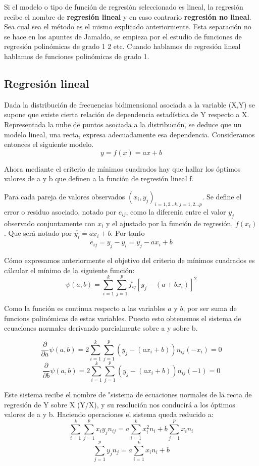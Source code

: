 \documentclass{article}
\begin{document}
	
	Si el modelo o tipo de función de regresión seleccionado es lineal, la regresión recibe el nombre de \textbf{regresión lineal} y en caso contrario \textbf{regresión no lineal}. Sea cual sea el método es el mismo explicado anteriormente. Esta separación no se hace en los apuntes de Jamaldo, se empieza por el estudio de funciones de regresión polinómicas de grado 1 2 etc. Cuando hablamos de regresión lineal hablamos de funciones polinómicas de grado 1.
	
	
	\subsection{Regresión lineal}
	
	Dada la distribución de frecuencias bidimensional asociada a la variable (X,Y) se supone que existe cierta relación de dependencia estadística de Y respecto a X. Representada la nube de puntos asociada a la distribución, se deduce que un modelo lineal, una recta, expresa adecuadamente esa dependencia. Consideramos entonces el siguiente modelo.
	$$ y = f(x) = ax + b $$
	
	Ahora mediante el criterio de mínimos cuadrados hay que hallar los óptimos valores de a y b que definen a la función de regresión lineal f.
	
	Para cada pareja de valores observados $(x_i,y_j)_{i=1,2...k, j=1,2...p}$. Se define el error o residuo asociado, notado por $e_{ij}$, como la diferenia entre el valor $y_j$ observado conjuntamente con $x_i$ y el ajustado por la función de regresión, $f(x_i)$. Que será notado por $\hat{y_i} = ax_i +b$.
	Por tanto $$e_{ij} = y_j - \hat{y_i} = y_j - ax_i + b $$
	
	Cómo expresamos anteriormente el objetivo del criterio de mínimos cuadrados es cálcular el mínimo de la siguiente función: 
	$$\psi (a,b) = \sum_{i=1}^k \sum_{j=1}^p f_{ij} [ y_j - (a+bx_i)]^2 $$
	
	Como la función es continua respecto a las variables $a$ y $b$, por ser suma de funcions polinómicas de estas variables. Puesto esto obtenemos el sistema de ecuaciones normales derivando parcialmente sobre a y sobre b.
	
	$$ \frac{\partial}{\partial a} \psi(a,b) = 2 \sum_{i=1}^k \sum_{j=1}^p ( y_j - (ax_i +b )) n_{ij} (-x_i) = 0 $$
	$$ \frac{\partial}{\partial b} \psi(a,b) = 2 \sum_{i=1}^k \sum_{j=1}^p ( y_j - (ax_i +b )) n_{ij} (-1) = 0 $$
	
	Este sistema recibe el nombre de "sistema de ecuaciones normales de la recta de regresión de Y sobre X (Y/X), y su resolución nos conducirá a los óptimos valores de a y b. Haciendo operaciones el sistema queda reducido a:
	$$  \sum_{i=1}^k \sum_{j=1}^p x_i y_j n_{ij}  = a \sum_{i=1}^k x_i^2 n_i + b\sum_{j= 1}^p x_i n_i $$
	$$ \sum_{j=1}^p y_j n_j = a \sum_{i=1}^k x_i n_i + b $$
	
\end{document}
